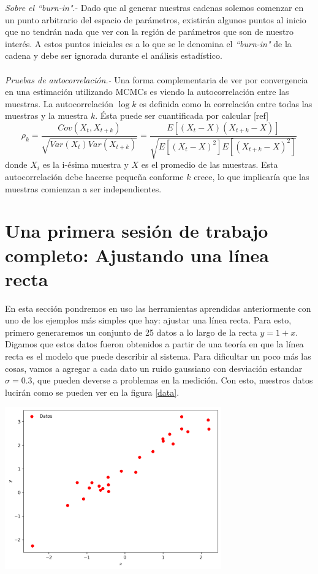 \documentclass[onecolumn,           %
               showpacs,            %
               preprintnumbers,     %
               aps,                 %
               prl,          	    %
               letterpaper,             %
               superscriptaddress,      %
               nofootinbib,         %
               tightenlines,        %
               floats,floatfix      %
               ,usenatbib,
               ]{revtex4-1}
\begin{document}
\textit{Sobre el ``burn-in"}.- Dado que al generar nuestras cadenas solemos comenzar en un punto arbitrario del espacio de par\'ametros, existir\'an algunos puntos al inicio que no tendr\'an nada que ver con la regi\'on de par\'ametros que son de nuestro inter\'es. A estos puntos iniciales es a lo que se le denomina el \textit{``burn-in"} de la cadena y debe ser ignorada durante el an\'alisis estad\'istico.
\\ $ $ \\

\textit{Pruebas de autocorrelaci\'on.-} Una forma complementaria de ver por convergencia en una estimaci\'on utilizando MCMCs es viendo la autocorrelaci\'on entre las muestras. La autocorrelaci\'on $\log k$ es definida como la correlaci\'on entre todas las muestras y la muestra $k$. \'Esta puede ser cuantificada por calcular [ref]
\begin{equation}
\rho_k=\frac{Cov(X_t,X_{t+k})}{\sqrt{Var(X_t)Var(X_{t+k})}}=\frac{E[(X_t-X)(X_{t+k}-X)]}{\sqrt{E[(X_t-X)^2]E[(X_{t+k}-X)^2]}}
\end{equation}
donde $X_i$ es la i-\'esima muestra y $X$ es el promedio de las muestras. Esta autocorrelaci\'on debe hacerse peque\~na conforme $k$ crece, lo que implicar\'ia que las muestras comienzan a ser independientes.

\section{Una primera sesi\'on de trabajo completo: Ajustando una l\'inea recta}

En esta secci\'on pondremos en uso las herramientas aprendidas anteriormente con uno de los ejemplos m\'as simples que hay: ajustar una l\'inea recta. Para esto, primero generaremos un conjunto de 25 datos a lo largo de la recta $y=1+x$. Digamos que estos datos fueron obtenidos a partir de una teor\'ia en que la l\'inea recta es el modelo que puede describir al sistema. Para dificultar un poco m\'as las cosas, vamos a agregar a cada dato un ruido gaussiano con desviaci\'on estandar $\sigma = 0.3$, que pueden deverse a problemas en la medici\'on. Con esto, nuestros datos lucir\'an como se pueden ver en la figura \ref{data}.

\begin{minipage}{\textwidth}
\centering
\includegraphics[height=7cm]{data.png}
\label{data}
\end{minipage}
\\
\end{document}
